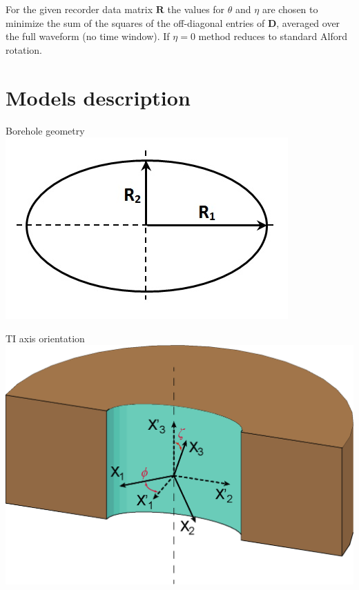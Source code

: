 \documentclass[a4paper,11pt]{article}
\begin{document}
For the given recorder data matrix $\mathbf{R}$ the values for $\theta$ and $\eta$ are chosen to minimize the sum of the squares of the off-diagonal entries of $\mathbf{D}$, averaged over the full waveform (no time window). If $\eta=0$ method reduces to standard Alford rotation.

\section{Models description}

\begin{minipage}[c]{0.47\linewidth}	
\begin{center}
		Borehole geometry \\
		\includegraphics[width=1\linewidth]{./images/nonorth_alford/scheme_bh_image_hr.jpg}	  
\end{center}	  		
\end{minipage} \hfill
\begin{minipage}[c]{0.47\linewidth}
\begin{center}
		TI axis orientation\\
			\includegraphics[width=1\linewidth]{./images/nonorth_alford/TI_axes_desc.eps}		
\end{center}
\end{minipage}
\end{document}
